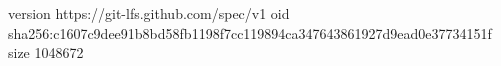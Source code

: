 version https://git-lfs.github.com/spec/v1
oid sha256:c1607c9dee91b8bd58fb1198f7cc119894ca347643861927d9ead0e37734151f
size 1048672
